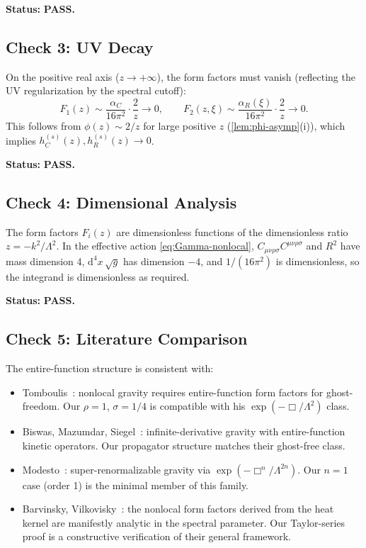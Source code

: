 \documentclass[11pt,a4paper]{article}
\newcommand{\Weylsq}{C_{\mu\nu\rho\sigma}C^{\mu\nu\rho\sigma}}
\renewcommand{\dd}{\mathrm{d}}
\theoremstyle{plain}
\theoremstyle{definition}
\begin{document}
\noindent\textbf{Status:} \textcolor{green!50!black}{\textbf{PASS.}}

\subsection{Check 3: UV Decay}

On the positive real axis ($z \to +\infty$), the form factors must
vanish (reflecting the UV regularization by the spectral cutoff):
\begin{equation}
  F_1(z) \sim \frac{\alpha_C}{16\pi^2}\cdot\frac{2}{z} \to 0,
  \qquad
  F_2(z,\xi) \sim \frac{\alpha_R(\xi)}{16\pi^2}\cdot\frac{2}{z} \to 0.
\end{equation}
This follows from $\phi(z) \sim 2/z$ for large positive $z$
(\cref{lem:phi-asymp}(i)), which implies
$h_C^{(s)}(z), h_R^{(s)}(z) \to 0$.

\noindent\textbf{Status:} \textcolor{green!50!black}{\textbf{PASS.}}

\subsection{Check 4: Dimensional Analysis}

The form factors $F_i(z)$ are dimensionless functions of the
dimensionless ratio $z = -k^2/\Lambda^2$. In the effective action
\cref{eq:Gamma-nonlocal}, $\Weylsq$ and $R^2$ have mass dimension 4,
$\dd^4 x\,\sqrt{g}$ has dimension $-4$, and $1/(16\pi^2)$ is
dimensionless, so the integrand is dimensionless as required.

\noindent\textbf{Status:} \textcolor{green!50!black}{\textbf{PASS.}}

\subsection{Check 5: Literature Comparison}

The entire-function structure is consistent with:
\begin{itemize}[nosep]
  \item Tomboulis~\cite{Tom97}: nonlocal gravity requires entire-function
    form factors for ghost-freedom. Our $\rho = 1$, $\sigma = 1/4$ is
    compatible with his $\exp(-\Box/\Lambda^2)$ class.
  \item Biswas, Mazumdar, Siegel~\cite{BMS06}: infinite-derivative gravity
    with entire-function kinetic operators. Our propagator structure
    matches their ghost-free class.
  \item Modesto~\cite{Mod12}: super-renormalizable gravity via
    $\exp(-\Box^n/\Lambda^{2n})$. Our $n = 1$ case (order 1) is the
    minimal member of this family.
  \item Barvinsky, Vilkovisky~\cite{BV87,BV90}: the nonlocal form factors
    derived from the heat kernel are manifestly analytic in the spectral
    parameter. Our Taylor-series proof is a constructive verification of
    their general framework.
\end{itemize}
\end{document}
